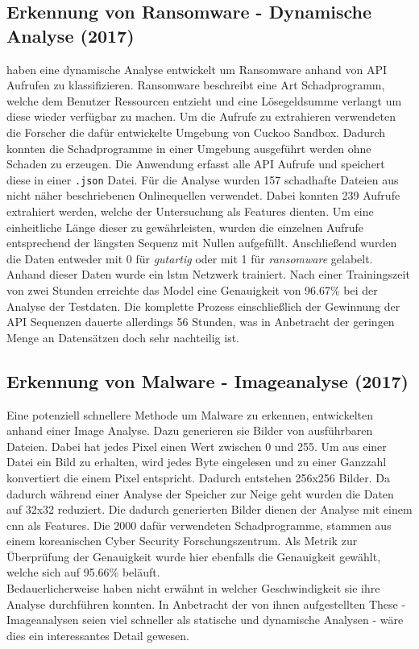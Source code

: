 \documentclass[
    12pt, %
    DIV10,
    ngerman, %
    a4paper, %
    oneside, %
    titlepage, %
    parskip=half, %
    headings=normal, %
    listof=totoc, %
    bibliography=totoc, %
    index=totoc, %
    captions=tableheading, %
    final %
]{scrreprt}
\begin{document}
\subsection{Erkennung von Ransomware - Dynamische Analyse (2017)}
\textcite{Maniath2018} haben eine dynamische Analyse entwickelt um Ransomware anhand von API Aufrufen zu klassifizieren. Ransomware beschreibt eine Art Schadprogramm, welche dem Benutzer Ressourcen entzieht und eine Lösegeldsumme verlangt um diese wieder verfügbar zu machen. Um die Aufrufe zu extrahieren verwendeten die Forscher die dafür entwickelte Umgebung von Cuckoo Sandbox. Dadurch konnten die Schadprogramme in einer Umgebung ausgeführt werden ohne Schaden zu erzeugen. Die Anwendung erfasst alle API Aufrufe und speichert diese in einer \texttt{.json} Datei. Für die Analyse wurden 157 schadhafte Dateien aus nicht näher beschriebenen Onlinequellen verwendet. Dabei konnten 239 Aufrufe extrahiert werden, welche der Untersuchung als Features dienten. Um eine einheitliche Länge dieser zu gewährleisten, wurden die einzelnen Aufrufe entsprechend der längsten Sequenz mit Nullen aufgefüllt. Anschlie{\ss}end wurden die Daten entweder mit 0 für \emph{gutartig} oder mit 1 für \emph{ransomware} gelabelt. Anhand dieser Daten wurde ein \ac{lstm} Netzwerk trainiert. Nach einer Trainingszeit von zwei Stunden erreichte das Model eine Genauigkeit von 96.67\% bei der Analyse der Testdaten. Die komplette Prozess einschlie{\ss}lich der Gewinnung der API Sequenzen dauerte allerdings 56 Stunden, was in Anbetracht der geringen Menge an Datensätzen doch sehr nachteilig ist.
%
\subsection{Erkennung von Malware - Imageanalyse (2017)}
Eine potenziell schnellere Methode um Malware zu erkennen, entwickelten \textcite{8190895} anhand einer Image Analyse. Dazu generieren sie Bilder von ausführbaren Dateien. Dabei hat jedes Pixel einen Wert zwischen 0 und 255. Um aus einer Datei ein Bild zu erhalten, wird jedes Byte eingelesen und zu einer Ganzzahl konvertiert die einem Pixel entspricht. Dadurch entstehen 256x256 Bilder. Da dadurch während einer Analyse der Speicher zur Neige geht wurden die Daten auf 32x32 reduziert. Die dadurch generierten Bilder dienen der Analyse mit einem \ac{cnn} als Features. Die 2000 dafür verwendeten Schadprogramme, stammen aus einem koreanischen Cyber Security Forschungszentrum. Als Metrik zur Überprüfung der Genauigkeit wurde hier ebenfalls die Genauigkeit gewählt, welche sich auf 95.66\% beläuft.\\
Bedauerlicherweise haben \textcite{8190895} nicht erwähnt in welcher Geschwindigkeit sie ihre Analyse durchführen konnten. In Anbetracht der von ihnen aufgestellten These - Imageanalysen seien viel schneller als statische und dynamische Analysen - wäre dies ein interessantes Detail gewesen.
\end{document}
